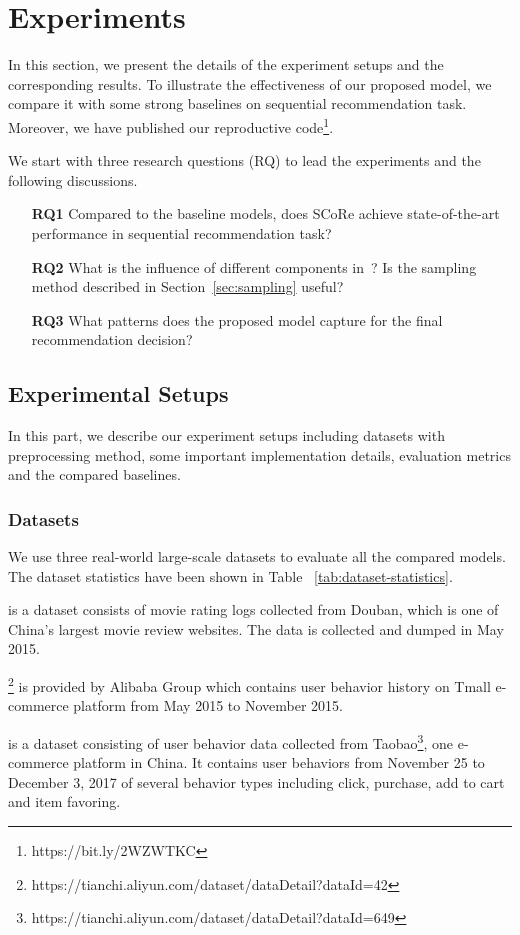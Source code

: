 \chapter{Experiments}\label{sec:exps}{}
In this section, we present the details of the experiment setups and the corresponding results. To illustrate the effectiveness of our proposed model, we compare it with some strong baselines on sequential recommendation task. Moreover, we have published our reproductive code\footnote{https://bit.ly/2WZWTKC}.

We start with three research questions (RQ) to lead the experiments and the following discussions.
\begin{itemize}
	\item [\textbf{RQ1}] Compared to the baseline models, does SCoRe achieve state-of-the-art performance in sequential recommendation task?
	\item [\textbf{RQ2}] What is the influence of different components in~\score? Is the sampling method described in Section~\ref{sec:sampling} useful?
	\item [\textbf{RQ3}] What patterns does the proposed model capture for the final recommendation decision?
\end{itemize}

\section{Experimental Setups}
In this part, we describe our experiment setups including datasets with preprocessing method, some important implementation details, evaluation metrics and the compared baselines.
\subsection{Datasets}
We use three real-world large-scale datasets to evaluate all the compared models. The dataset statistics have been shown in Table ~\ref{tab:dataset-statistics}.
\begin{description}[leftmargin=15pt]
	\item [CCMR] \cite{cao2016complete} is a dataset consists of movie rating logs collected from Douban, which is one of China's largest movie review websites. The data is collected and dumped in May 2015.
	\item [Tmall] \footnote{https://tianchi.aliyun.com/dataset/dataDetail?dataId=42} is provided by Alibaba Group which contains user behavior history on Tmall e-commerce platform from May 2015 to November 2015.
	\item [Taobao] \cite{zhu2018learning} is a dataset consisting of user behavior data collected from Taobao\footnote{https://tianchi.aliyun.com/dataset/dataDetail?dataId=649}, one e-commerce platform in China. It contains user behaviors from November 25 to December 3, 2017 of several behavior types including click, purchase, add to cart and item favoring.
\end{description}

